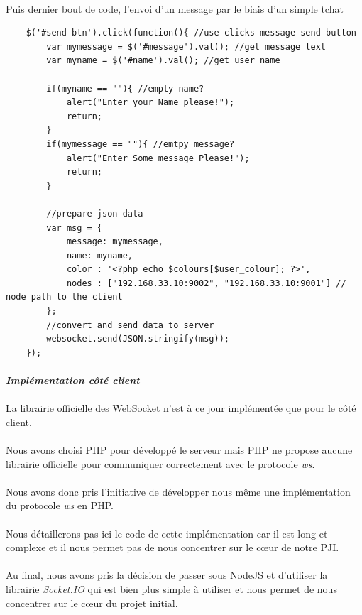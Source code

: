 \documentclass[a4paper,12pt]{report}
\begin{document}
	\paragraph*{}
	Puis dernier bout de code, l'envoi d'un message par le biais d'un simple tchat
	\begin{lstlisting}
	$('#send-btn').click(function(){ //use clicks message send button	
		var mymessage = $('#message').val(); //get message text
		var myname = $('#name').val(); //get user name
		
		if(myname == ""){ //empty name?
			alert("Enter your Name please!");
			return;
		}
		if(mymessage == ""){ //emtpy message?
			alert("Enter Some message Please!");
			return;
		}
		
		//prepare json data
		var msg = {
			message: mymessage,
			name: myname,
			color : '<?php echo $colours[$user_colour]; ?>',
			nodes : ["192.168.33.10:9002", "192.168.33.10:9001"] // node path to the client
		};
		//convert and send data to server
		websocket.send(JSON.stringify(msg));
	});
	\end{lstlisting}	
	\paragraph*{}
	\textit{\textbf{Implémentation côté client}} 
	\paragraph*{}
	La librairie officielle des WebSocket n'est à ce jour implémentée que pour le côté client. 
	\paragraph*{}
	Nous avons choisi PHP pour développé le serveur mais PHP ne propose aucune librairie officielle pour communiquer correctement avec le protocole \emph{ws}. 
	\paragraph*{}
	Nous avons donc pris l'initiative de développer nous même une implémentation du protocole \emph{ws} en PHP.
	\paragraph*{}
	Nous détaillerons pas ici le code de cette implémentation car il est long et complexe et il nous permet pas de nous concentrer sur le cœur de notre PJI.
	\paragraph*{}
	Au final, nous avons pris la décision de passer sous NodeJS et d'utiliser la librairie \emph{Socket.IO} qui est bien plus simple à utiliser et nous permet de nous concentrer sur le cœur du projet initial.
\end{document}
